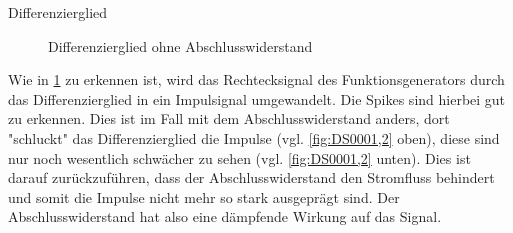 \documentclass[ngerman]{scrartcl}
\theoremstyle{definition}
\begin{document}
\begin{aufgabe}{Differenzierglied}
\begin{figure}[H]
				\caption{Differenzierglied ohne Abschlusswiderstand}
				\label{fig:DS0000}
			\end{figure}
			\auswertung
				Wie in \ref{fig:DS0000} zu erkennen ist, wird das Rechtecksignal des Funktionsgenerators durch das Differenzierglied in ein Impulsignal umgewandelt. Die Spikes sind hierbei gut zu erkennen. Dies ist im Fall mit dem Abschlusswiderstand anders, dort "schluckt" das Differenzierglied die Impulse (vgl. \ref{fig:DS0001,2} oben), diese sind nur noch wesentlich schwächer zu sehen (vgl. \ref{fig:DS0001,2} unten). Dies ist darauf zurückzuführen, dass der Abschlusswiderstand den Stromfluss behindert und somit die Impulse nicht mehr so stark ausgeprägt sind. Der Abschlusswiderstand hat also eine dämpfende Wirkung auf das Signal.

		\end{aufgabe}
\clearpage
\end{document}
